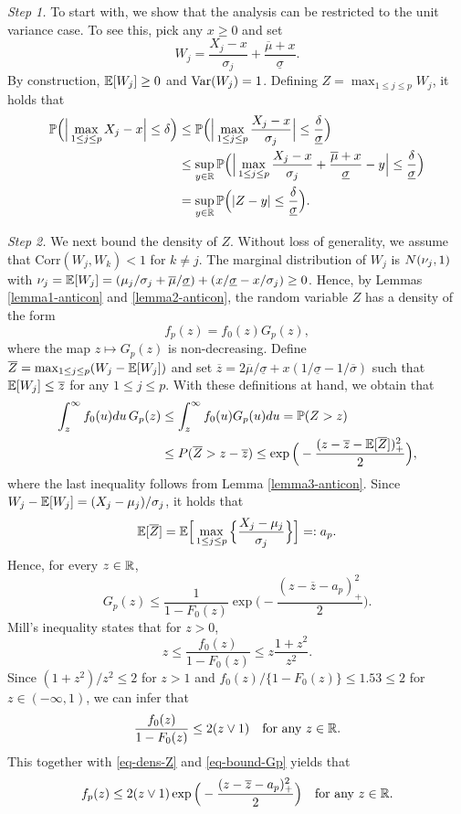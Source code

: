 \documentclass[a4paper,12pt]{article}
\begin{document}
\textit{Step 1.} To start with, we show that the analysis can be restricted to the unit variance case. To see this, pick any $x \ge 0$ and set 
\[ W_j = \frac{X_j - x}{\sigma_j} + \frac{\overline{\mu} + x}{\underline{\sigma}}. \]
By construction, $\mathbb{E}[W_j] \ge 0$ and $\textnormal{Var}(W_j) = 1$. Defining $Z = \max_{1 \le j \le p} W_j$, it holds that  
\begin{align*}
\mathbb{P} \Big( \Big| \max_{1 \le j \le p} X_j - x \Big| \le \delta \Big) 
 & \le \mathbb{P} \Big( \Big| \max_{1 \le j \le p} \frac{X_j - x}{\sigma_j} \Big| \le \frac{\delta}{\underline{\sigma}} \Big) \\
 & \le \sup_{y \in \mathbb{R}} \mathbb{P} \Big( \Big| \max_{1 \le j \le p} \frac{X_j - x}{\sigma_j} + \frac{\overline{\mu} + x}{\underline{\sigma}} - y \Big| \le \frac{\delta}{\underline{\sigma}} \Big) \\
 & = \sup_{y \in \mathbb{R}} \mathbb{P} \Big( |Z - y| \le \frac{\delta}{\underline{\sigma}} \Big). 
\end{align*}


\textit{Step 2.} We next bound the density of $Z$. Without loss of generality, we assume that $\text{Corr}(W_j,W_k) < 1$ for $k \ne j$. The marginal distribution of $W_j$ is $N(\nu_j,1)$ with $\nu_j = \mathbb{E}[W_j] = (\mu_j/\sigma_j + \overline{\mu}/{\underline{\sigma}}) + (x/\underline{\sigma} - x/\sigma_j) \ge 0$. Hence, by Lemmas \ref{lemma1-anticon} and \ref{lemma2-anticon}, the random variable $Z$ has a density of the form
\begin{equation}\label{eq-dens-Z}
f_p(z) = f_0(z) G_p(z), 
\end{equation}
where the map $z \mapsto G_p(z)$ is non-decreasing. Define $\overline{Z} = \max_{1 \le j \le p} (W_j - \mathbb{E}[W_j])$ and set $\overline{z} = 2 \overline{\mu}/\underline{\sigma} + x(1/\underline{\sigma} - 1/\overline{\sigma})$ such that $\mathbb{E}[W_j] \le \overline{z}$ for any $1 \le j \le p$. With these definitions at hand, we obtain that  
\begin{align*}
\int_z^{\infty} f_0(u)du \, G_p(z) & \le \int_z^{\infty} f_0(u) G_p(u) du = \mathbb{P}(Z > z) \\ 
 & \le P(\overline{Z} > z - \overline{z}) \le \exp \Big( - \frac{(z - \overline{z} - \mathbb{E}[\overline{Z}])^2_+}{2} \Big), 
\end{align*}
where the last inequality follows from Lemma \ref{lemma3-anticon}. Since $W_j - \mathbb{E}[W_j] = (X_j - \mu_j)/\sigma_j$, it holds that 
\[ \mathbb{E}[\overline{Z}] = \mathbb{E} \Big[ \max_{1 \le j \le p} \Big\{ \frac{X_j-\mu_j}{\sigma_j} \Big\} \Big] =: a_p. \]
Hence, for every $z \in \mathbb{R}$, 
\begin{equation}\label{eq-bound-Gp}
G_p(z) \le \frac{1}{1 - F_0(z)} \exp\Big( - \frac{(z - \overline{z} - a_p)_+^2}{2} \Big). 
\end{equation}
Mill's inequality states that for $z > 0$, 
\[ z \le \frac{f_0(z)}{1-F_0(z)} \le z \frac{1+z^2}{z^2}. \]
Since $(1+z^2)/z^2 \le 2$ for $z > 1$ and $f_0(z)/\{1-F_0(z)\} \le 1.53 \le 2$ for $z \in (-\infty,1)$, we can infer that
\[ \frac{f_0(z)}{1-F_0(z)} \le 2 (z \vee 1) \quad \text{for any } z \in \mathbb{R}. \]
This together with \eqref{eq-dens-Z} and \eqref{eq-bound-Gp} yields that
\[ f_p(z) \le 2 (z \vee 1)  \exp\Big( - \frac{(z - \overline{z} - a_p)_+^2}{2} \Big) \quad \text{for any } z \in \mathbb{R}. \]
 
\end{document}

